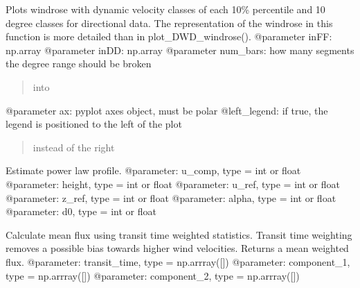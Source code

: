 \documentclass[letterpaper,10pt,english]{sphinxmanual}
\begin{document}
\begin{fulllineitems}
\label{\detokenize{index:windtunnel.plotwindrose}}
Plots windrose with dynamic velocity classes of each 10\% percentile and
10 degree classes for directional data. The representation of the windrose 
in this function is more detailed than in plot\_DWD\_windrose().
@parameter inFF: np.array
@parameter inDD: np.array
@parameter num\_bars: how many segments the degree range should be broken
\begin{quote}

into
\end{quote}

@parameter ax: pyplot axes object, must be polar
@left\_legend: if true, the legend is positioned to the left of the plot
\begin{quote}

instead of the right
\end{quote}

\end{fulllineitems}


\begin{fulllineitems}
\label{\detokenize{index:windtunnel.power_law}}
Estimate power law profile.
@parameter: u\_comp, type = int or float
@parameter: height, type = int or float
@parameter: u\_ref, type = int or float
@parameter: z\_ref, type = int or float
@parameter: alpha, type = int or float
@parameter: d0, type = int or float

\end{fulllineitems}


\begin{fulllineitems}
\label{\detokenize{index:windtunnel.transit_time_weighted_flux}}
Calculate mean flux using transit time weighted statistics. Transit
time weighting removes a possible bias towards higher wind velocities.
Returns a mean weighted flux.
@parameter: transit\_time, type = np.arrray({[}{]})
@parameter: component\_1,  type = np.arrray({[}{]})
@parameter: component\_2,  type = np.arrray({[}{]})

\end{fulllineitems}
\end{document}
